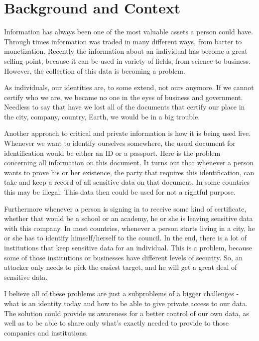 \documentclass[a4paper,11pt]{report}
\begin{document}
\section{Background and Context}

\label{introduction-background}

Information has always been one of the most valuable assets a person could have. Through times information was traded in many different ways, from barter to monetization. Recently the information about an individual has become a great selling point, because it can be used in variety of fields, from science to business. However, the collection of this data is becoming a problem.

	As individuals, our identities are, to some extend, not ours anymore. If we cannot certify who we are, we became no one in the eyes of business and government. Needless to say that have we lost all of the documents that certify our place in the city, company, country, Earth, we would be in a big trouble. \cite{allen2016path}
	
		Another approach to critical and private information is how it is being used live. Whenever we want to identify ourselves somewhere, the usual document for identification would be either an ID or a passport. Here is the problem concerning all information on this document. It turns out that whenever a person wants to prove his or her existence, the party that requires this identification, can take and keep a record of all sensitive data on that document. In some countries this may be illegal. This data then could be used for not a rightful purpose. \cite{alboaie2017private}
		
Furthermore whenever a person is signing in to receive some kind of certificate, whether that would be a school or an academy, he or she is leaving sensitive data with this company. In most countries, whenever a person starts living in a city, he or she has to identify himself/herself to the council. In the end, there is a lot of institutions that keep sensitive data for an individual. This is a problem, because some of those institutions or businesses have different levels of security. So, an attacker only needs to pick the easiest target, and he will get a great deal of sensitive data. 

	I believe all of these problems are just a subproblems of a bigger challenges - what is an identity today and how to be able to give private access to our data. The solution could provide us awareness for a better control of our own data, as well as to be able to share only what’s exactly needed to provide to those companies and institutions.
\end{document}
